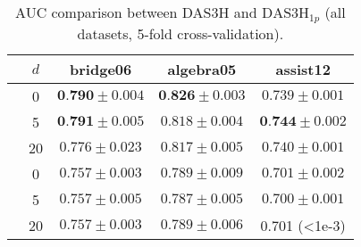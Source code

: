 \begin{table}
\centering
\begin{tabular}{ccccc}
\toprule
        &   $d$            &  bridge06 &             algebra05 & assist12 \\
\midrule
\parbox[t]{2.2mm}{} & 0 & $\textbf{0.790} \pm 0.004$ & $\textbf{0.826} \pm 0.003$ & $0.739 \pm 0.001$\\
& 5 & $\textbf{0.791} \pm 0.005$ & $0.818 \pm 0.004$ & $\textbf{0.744} \pm 0.002$ \\
& 20 & $0.776 \pm 0.023$ & $0.817 \pm 0.005$ & $0.740 \pm 0.001$ \\[1em]
\parbox[t]{2.2mm}{} & 0 & $0.757 \pm 0.003$ & $0.789 \pm 0.009$ & $0.701 \pm 0.002$ \\
& 5 & $0.757 \pm 0.005$ & $0.787 \pm 0.005$ & $0.700 \pm 0.001$ \\
& 20 & $0.757 \pm 0.003$ & $0.789 \pm 0.006$ & 0.701 (<1e-3) \\[0.5em]
\bottomrule
\end{tabular}
\caption{AUC comparison between DAS3H and $\text{DAS3H}_{1p}$ (all datasets, 5-fold cross-validation).}
\end{table}